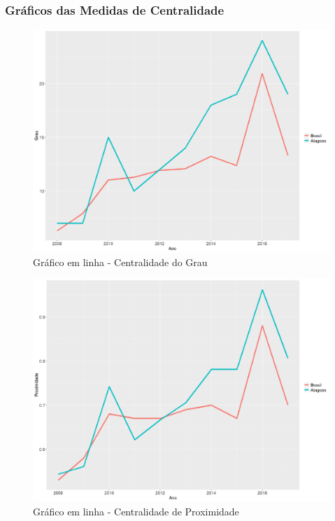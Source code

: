 \documentclass[12pt]{article}
\begin{document}
\subsubsection{Gráficos das Medidas de Centralidade}

\begin{figure}[H]
\centering
\includegraphics[scale=0.5]{images/graf-linha-degree-br-al.pdf}
\caption{Gráfico em linha - Centralidade do Grau}
\end{figure}

\begin{figure}[H]
\centering
\includegraphics[scale=0.5]{images/graf-linha-closeness-br-al.pdf}
\caption{Gráfico em linha - Centralidade de Proximidade}
\end{figure}
\end{document}
